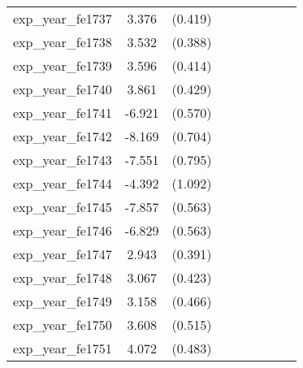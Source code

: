 {\begin{tabular}{l*{4}{cc}}
exp\_year\_fe1737&    3.376\sym{***}&  (0.419)&                  &         &                  &         &                  &         \\
exp\_year\_fe1738&    3.532\sym{***}&  (0.388)&                  &         &                  &         &                  &         \\
exp\_year\_fe1739&    3.596\sym{***}&  (0.414)&                  &         &                  &         &                  &         \\
exp\_year\_fe1740&    3.861\sym{***}&  (0.429)&                  &         &                  &         &                  &         \\
exp\_year\_fe1741&   -6.921\sym{***}&  (0.570)&                  &         &                  &         &                  &         \\
exp\_year\_fe1742&   -8.169\sym{***}&  (0.704)&                  &         &                  &         &                  &         \\
exp\_year\_fe1743&   -7.551\sym{***}&  (0.795)&                  &         &                  &         &                  &         \\
exp\_year\_fe1744&   -4.392\sym{***}&  (1.092)&                  &         &                  &         &                  &         \\
exp\_year\_fe1745&   -7.857\sym{***}&  (0.563)&                  &         &                  &         &                  &         \\
exp\_year\_fe1746&   -6.829\sym{***}&  (0.563)&                  &         &                  &         &                  &         \\
exp\_year\_fe1747&    2.943\sym{***}&  (0.391)&                  &         &                  &         &                  &         \\
exp\_year\_fe1748&    3.067\sym{***}&  (0.423)&                  &         &                  &         &                  &         \\
exp\_year\_fe1749&    3.158\sym{***}&  (0.466)&                  &         &                  &         &                  &         \\
exp\_year\_fe1750&    3.608\sym{***}&  (0.515)&                  &         &                  &         &                  &         \\
exp\_year\_fe1751&    4.072\sym{***}&  (0.483)&                  &         &                  &         &                  &         \\

\end{tabular}}
